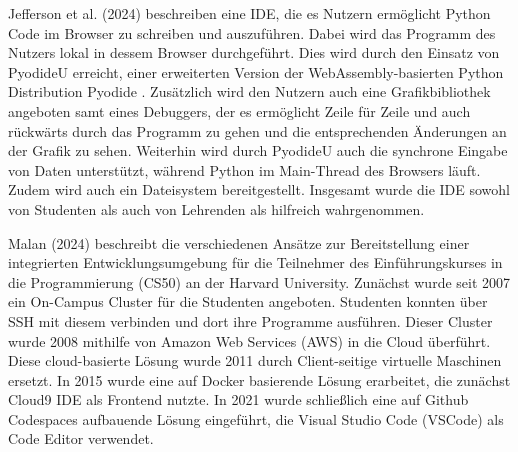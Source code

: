 Jefferson et al. (2024) \cite{jefferson_pyodideu_2024} beschreiben eine IDE, die es Nutzern ermöglicht Python Code im Browser zu schreiben und auszuführen. Dabei wird das Programm des Nutzers lokal in dessem Browser durchgeführt. Dies wird durch den Einsatz von PyodideU erreicht, einer erweiterten Version der WebAssembly-basierten Python Distribution Pyodide \cite{noauthor_pyodide_nodate}. Zusätzlich wird den Nutzern auch eine Grafikbibliothek angeboten samt eines Debuggers, der es ermöglicht Zeile für Zeile und auch rückwärts durch das Programm zu gehen und die entsprechenden Änderungen an der Grafik zu sehen. Weiterhin wird durch PyodideU auch die synchrone Eingabe von Daten unterstützt, während Python im Main-Thread des Browsers läuft. Zudem wird auch ein Dateisystem bereitgestellt. Insgesamt wurde die IDE sowohl von Studenten als auch von Lehrenden als hilfreich wahrgenommen. 

Malan (2024) \cite{malan_containerizing_2024} beschreibt die verschiedenen Ansätze zur Bereitstellung einer integrierten Entwicklungsumgebung für die Teilnehmer des Einführungskurses in die Programmierung (CS50) an der Harvard University. Zunächst wurde seit 2007 ein On-Campus Cluster für die Studenten angeboten. Studenten konnten über SSH mit diesem verbinden und dort ihre Programme ausführen. Dieser Cluster wurde 2008 mithilfe von Amazon Web Services (AWS) \cite{noauthor_amazon_nodate} in die Cloud überführt. Diese cloud-basierte Lösung wurde 2011 durch Client-seitige virtuelle Maschinen ersetzt. In 2015 wurde eine auf Docker basierende Lösung erarbeitet, die zunächst Cloud9 IDE \cite{noauthor_cloud_nodate} als Frontend nutzte. In 2021 wurde schließlich eine auf Github Codespaces aufbauende Lösung eingeführt, die Visual Studio Code (VSCode)  als Code Editor verwendet. 


